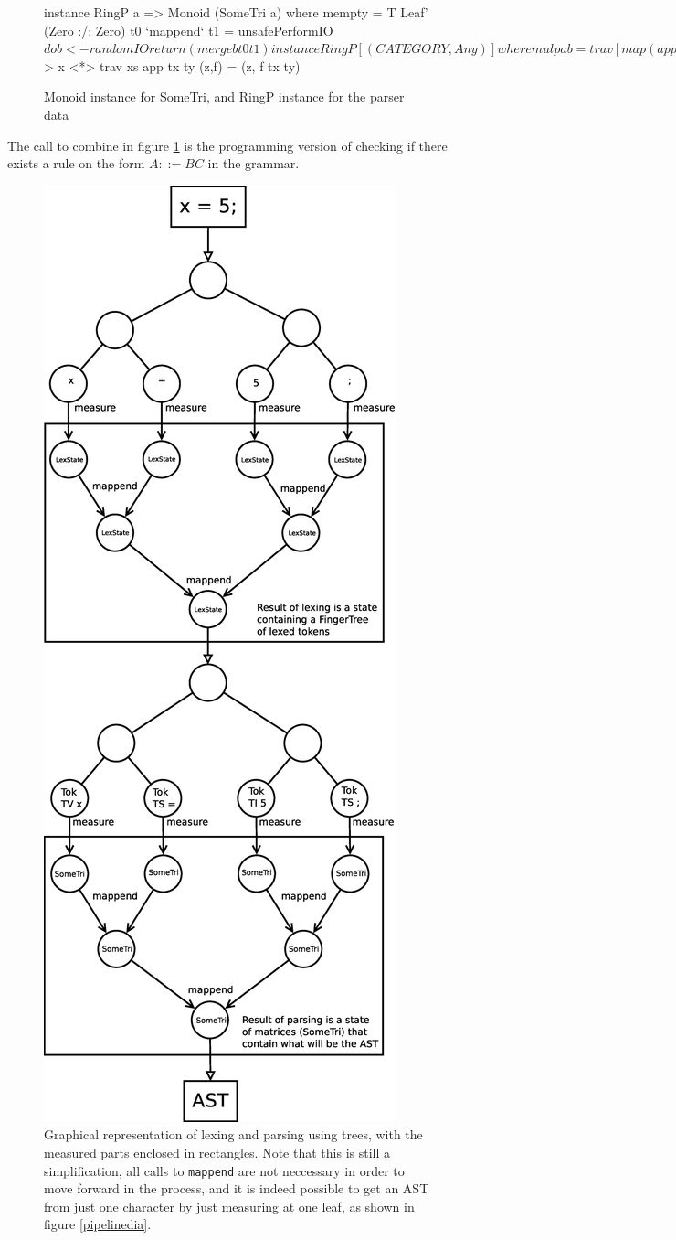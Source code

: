 \documentclass[a4paper,12pt,twosided]{report}
\begin{document}
\begin{figure}[H]
\begin{code}
instance RingP a => Monoid (SomeTri a) where
    mempty = T Leaf' (Zero :/: Zero)
    t0 `mappend` t1 = unsafePerformIO $ do
      b <- randomIO
      return (merge b t0 t1)

instance RingP [(CATEGORY,Any)] where
  mul p a b = trav [map (app tx ty) l :/: map (app tx ty) r 
                   | (x,tx) <- a, (y,ty) <- b
                   , let l:/:r = combine p x y]
    where trav :: [Pair [a]] -> Pair [a]
          trav [] = pure []
          trav (x:xs) = (++) <$> x <*> trav xs
          app tx ty (z,f)  = (z, f tx ty)
\end{code}
\caption{\label{parsemonoid}Monoid instance for SomeTri, and RingP instance for
the parser data}
\end{figure}
The call to combine in figure \ref{parsemonoid} is the programming version of
checking if there exists a rule on the form $A ::= BC$ in the grammar.

\begin{figure}[H]
\centering
\includegraphics[width=.5\textwidth]{tree.eps}
\caption{\label{treemeasure}Graphical representation of lexing and parsing using
trees, with the measured parts enclosed in rectangles. Note that this is still a
simplification, all calls to \texttt{mappend} are not neccessary in order to
move forward in the process, and it is indeed possible to get an AST from just
one character by just measuring at one leaf, as shown in figure
\ref{pipelinedia}.}
\end{figure}
\end{document}
